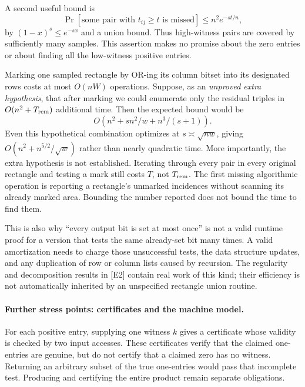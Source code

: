 \documentclass[11pt]{article}
\begin{document}
A second useful bound is
\[
 \Pr[\text{some pair with }t_{ij}\geq t\text{ is missed}]
                         \leq n^2 e^{-st/n},
\]
by $(1-x)^s\leq e^{-sx}$ and a union bound. Thus high-witness pairs
are covered by sufficiently many samples. This assertion makes no promise
about the zero entries or about finding all the low-witness positive entries.

Marking one sampled rectangle by OR-ing its column bitset into its
designated rows costs at most $O(nW)$ operations. Suppose, as an
\emph{unproved extra hypothesis}, that after marking we could enumerate
only the residual triples in $O(n^2+T_{\rm rem})$ additional time.
Then the expected bound would be
\begin{equation}\label{a480:hypothetical}
                  O(n^2+sn^2/w+n^3/(s+1)).
\end{equation}
Even this hypothetical combination optimizes at
$s\asymp\sqrt{nw}$, giving $O(n^2+n^{5/2}/\sqrt w)$ rather than
nearly quadratic time. More importantly, the extra hypothesis is not
established. Iterating through every pair in every original rectangle and
testing a mark still costs $T$, not $T_{\rm rem}$. The first missing
algorithmic operation is reporting a rectangle's unmarked incidences
without scanning its already marked area. Bounding the number reported
does not bound the time to find them.

This is also why ``every output bit is set at most once'' is not a valid
runtime proof for a version that tests the same already-set bit many times.
A valid amortization needs to charge those unsuccessful tests, the data
structure updates, and any duplication of row or column lists caused by
recursion. The regularity and decomposition results in [E2] contain real
work of this kind; their efficiency is not automatically inherited by an
unspecified rectangle union routine.

\paragraph{Further stress points: certificates and the machine model.}
For each positive entry, supplying one witness $k$ gives a certificate
whose validity is checked by two input accesses. These certificates verify
that the claimed one-entries are genuine, but do not certify that a claimed
zero has no witness. Returning an arbitrary subset of the true one-entries
would pass that incomplete test. Producing and certifying the entire
product remain separate obligations.
\end{document}
